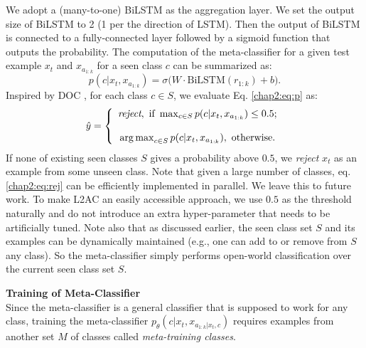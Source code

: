 We adopt a (many-to-one) BiLSTM \cite{hochreiter1997long,schuster1997bidirectional} as the aggregation layer.
We set the output size of BiLSTM to 2 (1 per the direction of LSTM). 
Then the output of BiLSTM is connected to a fully-connected layer followed by a sigmoid function that outputs the probability.
The computation of the meta-classifier for a given test example $x_t$ and $x_{a_{1:k}}$ for a seen class $c$ can be summarized as: 
\begin{equation}
    \label{chap2:eq:p}
p(c|x_t, x_{a_{1:k}} )=\sigma\big(W\cdot \text{BiLSTM}(r_{1:k})+b\big).
\end{equation}
Inspired by DOC \cite{shu-xu-liu:2017:EMNLP2017}, 
for each class $c \in S$, we evaluate Eq. \ref{chap2:eq:p} as:
\begin{equation} 
    \label{chap2:eq:rej}
        \hat{y} = \left\{
        \begin{array}{c}
        \textit{reject}, \text{ if } \max_{c \in S} p(c|x_t, x_{a_{1:k}} ) \le 0.5 ;\\
        \\
        \operatorname*{arg\,max}_{c \in S} p(c|x_t, x_{a_{1:k}} ) ,\text{ otherwise.}
        \end{array} \right.
\end{equation}
If none of existing seen classes $S$ gives a probability above $0.5$, we \emph{reject} $x_t$ as an example from some unseen class.
Note that given a large number of classes, eq. \ref{chap2:eq:rej} can be efficiently implemented in parallel. We leave this to future work.
To make L2AC an easily accessible approach, we use $0.5$ as the threshold naturally and do not introduce an extra hyper-parameter that needs to be artificially tuned.
Note also that as discussed earlier, the seen class set $S$ and its examples can be dynamically maintained (e.g., one can add to or remove from $S$ any class). So the meta-classifier simply performs open-world classification over the current seen class set $S$.

\textbf{Training of Meta-Classifier}\\
\label{chap2:sec:train}
Since the meta-classifier is a general classifier that is supposed to work for any class,
training the meta-classifier $p_\theta(c|x_t, x_{a_{1:k}|x_t, c} )$
requires examples from another set $M$ of classes called \textit{meta-training classes}.

